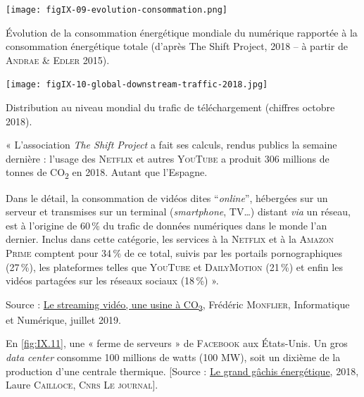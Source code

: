 \vspace{6pt}
\begin{jazzfigure}
\texttt{[image: figIX-09-evolution-consommation.png]}
\caption{\label{fig:IX.9}Évolution de la consommation énergétique mondiale du numérique rapportée à la con\-sommation énergétique totale (d'après The Shift Project, 2018 -- à partir de \textsc{Andrae} \& \textsc{Edler} 2015).}
\end{jazzfigure}

\vspace{6pt}
\begin{jazzfigure}
\centering
\texttt{[image: figIX-10-global-downstream-traffic-2018.jpg]}
\caption{\label{fig:IX.10}Distribution au niveau mondial du trafic de téléchargement (chiffres octobre 2018).}
\end{jazzfigure}



« L'association \textit{The Shift Project} a fait ses calculs, rendus publics la semaine dernière : l'usage des \textsc{Netflix} et autres \textsc{YouTube} a produit 306 millions de tonnes de CO\textsubscript{2} en 2018. Autant que l'Espagne.

Dans le détail, la consommation de vidéos dites “\textit{online}”, hébergées sur un serveur et transmises sur un terminal (\textit{smartphone}, TV…) distant \textit{via} un réseau, est à l’origine de 60\,\% du trafic de données numériques dans le monde l’an dernier. Inclus dans cette catégorie, les services à la \textsc{Netflix} et à la \textsc{Amazon Prime} comptent pour 34\,\% de ce total, suivis par les portails pornographiques (27\,\%), les plateformes telles que \textsc{YouTube} et \textsc{DailyMotion} (21\,\%) et enfin les vidéos partagées sur les réseaux sociaux (18\,\%) ».

\noindent Source : \href{https://www.techniques-ingenieur.fr/actualite/articles/le-streaming-video-une-usine-a-co2-68488/}{Le streaming vidéo, une usine à CO\textsubscript{2}}, Frédéric \textsc{Monflier}, Informatique et Numérique, juillet 2019.




En \cref{fig:IX.11}, une « ferme de serveurs » de \textsc{Facebook} aux États-Unis. Un gros \textit{data center} consomme 100 millions de watts (100 MW), soit un dixième de la production d’une centrale thermique. [Source : \href{https://lejournal.cnrs.fr/articles/numerique-le-grand-gachis-energetique}{Le grand gâchis énergétique}, 2018, Laure \textsc{Cailloce}, \textsc{Cnrs Le journal}].



